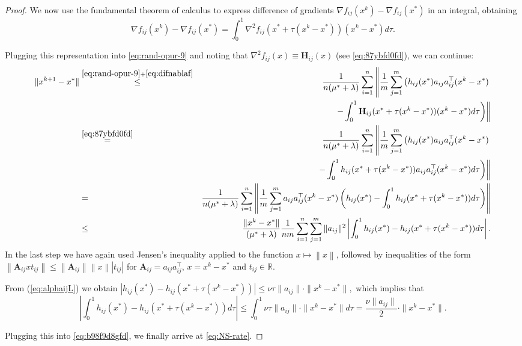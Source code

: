 \documentclass[12pt]{article}
\newcommand{\R}{\mathbb{R}}
\newcommand{\norm}[1]{\left\|#1\right\|}
\newcommand{\newalpha}{h}
\newcommand{\mA}{\mathbf{A}}
\newcommand{\mH}{\mathbf{H}}
\begin{document}
\begin{proof}
{We now use the fundamental theorem of calculus to express difference of gradients $\nabla f_{ij}(x^k) - \nabla f_{ij}(x^*)$ in an integral, obtaining
\begin{equation}\label{eq:difnablaf}
\nabla f_{ij}(x^k) - \nabla f_{ij}(x^*) = \int_{0}^1 \nabla^2 f_{ij}(x^* + \tau (x^k-x^*)) (x^k-x^*) d\tau. 
\end{equation}

Plugging this representation into	\eqref{eq:rand-opur-9} and noting that $ \nabla^2 f_{ij}(x)\equiv \mH_{ij}(x)$ (see \eqref{eq:87ybfd0fd}), we can continue:
\begin{eqnarray}	
	\|x^{k+1} - x^*\| 	& \overset{\eqref{eq:rand-opur-9}+\eqref{eq:difnablaf}}{ \leq} & \frac{1}{n (\mu^*+\lambda)} \sum_{i=1}^n \left\|   \frac{1}{m}  \sum_{j=1}^{m} \left(  \newalpha_{ij}(x^*) a_{ij}a_{ij}^\top (x^k - x^*)\right.\right.\notag\\
	&& \quad \left.\left.-  \int_{0}^1 \mH_{ij} (x^* + \tau(x^k - x^*)) (x^k - x^*)d\tau  \right)   \right\|  \notag \\ 
	&\overset{\eqref{eq:87ybfd0fd}}{=}& \frac{1}{n (\mu^*+\lambda)} \sum_{i=1}^n  \left\| \frac{1}{m} \sum_{j=1}^{m} \left(  \newalpha_{ij}(x^*) a_{ij}a_{ij}^\top (x^k - x^*)\right.\right.\notag\\
	&&\quad \left.\left.-  \int_{0}^1 \newalpha_{ij} (x^* + \tau(x^k - x^*))a_{ij}a_{ij}^\top (x^k - x^*)d\tau  \right)\right\| \notag  \\ 
	&=& \frac{1}{n (\mu^*+\lambda)} \sum_{i=1}^n  \left\| \frac{1}{m} \sum_{j=1}^{m}  a_{ij}a_{ij}^\top (x^k - x^*) \left( \newalpha_{ij}(x^*) - \int_{0}^1 \newalpha_{ij}(x^* + \tau(x^k - x^*))  d\tau \right) \right\|  \notag \\ 
	&\leq& \frac{ \|x^k - x^*\|}{ (\mu^*+\lambda)} \frac{1}{nm}\sum_{i=1}^n \sum_{j=1}^{m} \|a_{ij}\|^2 \left|   \int_{0}^1  \newalpha_{ij}(x^*) - \newalpha_{ij}(x^* + \tau(x^k - x^*))  d\tau  \right|. \label{eq:b98f9d8gfd}
\end{eqnarray}
In the last step we have again used Jensen's inequality applied to the function $x\mapsto \norm{x}$, followed by  inequalities of the form $\norm{\mA_{ij} x t_{ij}} \leq \norm{\mA_{ij}} \norm{x} |t_{ij}|$ for $\mA_{ij} = a_{ij}a_{ij}^\top $, $x=x^k-x^*$ and $t_{ij}\in \R$.

From (\ref{eq:alphaijL})  we obtain
$
| \newalpha_{ij}(x^*) - \newalpha_{ij}(x^* + \tau(x^k - x^*))| \leq \nu \tau \|a_{ij}\| \cdot \|x^k - x^*\|, 
$
which implies that 
$$
\left|   \int_{0}^1  \newalpha_{ij}(x^*) - \newalpha_{ij}(x^* + \tau(x^k - x^*))  d\tau  \right| \leq \int_{0}^1 \nu \tau \|a_{ij}\| \cdot \|x^k - x^*\| d\tau = \frac{\nu \|a_{ij}\|}{2} \cdot \|x^k - x^*\|. 
$$

Plugging this into \eqref{eq:b98f9d8gfd}, we finally arrive at \eqref{eq:NS-rate}.
}
\end{proof}
\end{document}
